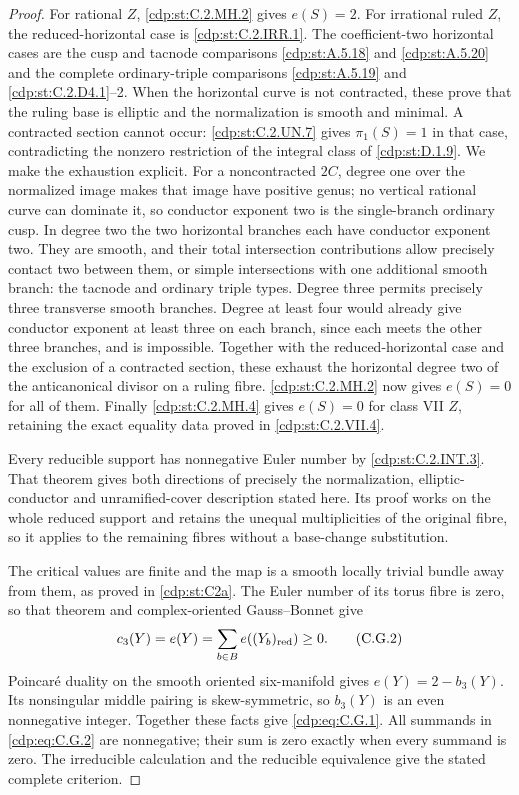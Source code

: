 \begin{proof}
For rational $Z$, \ref{cdp:st:C.2.MH.2} gives $e(S)=2$. For irrational
ruled $Z$, the reduced-horizontal case is \ref{cdp:st:C.2.IRR.1}. The
coefficient-two horizontal cases are the cusp and tacnode
comparisons \ref{cdp:st:A.5.18} and \ref{cdp:st:A.5.20} and the complete ordinary-triple
comparisons \ref{cdp:st:A.5.19} and \ref{cdp:st:C.2.D4.1}--2. When the horizontal curve
is not contracted, these prove that the ruling base is
elliptic and the normalization is smooth and minimal.
A contracted section cannot occur: \ref{cdp:st:C.2.UN.7} gives
$\pi_1(S)=1$ in that case, contradicting the nonzero
restriction of the integral class of \ref{cdp:st:D.1.9}.
We make the exhaustion explicit. For a noncontracted $2C$,
degree one over the normalized image makes that image have
positive genus; no vertical rational curve can dominate it,
so conductor exponent two is the single-branch ordinary
cusp. In degree two the two horizontal branches each have
conductor exponent two. They are smooth, and their total
intersection contributions allow precisely contact two
between them, or simple intersections with one additional
smooth branch: the tacnode and ordinary triple types.
Degree three permits precisely three transverse smooth
branches. Degree at least four would already give
conductor exponent at least three on each branch, since
each meets the other three branches, and is impossible.
Together with the reduced-horizontal case and the exclusion
of a contracted section,
these exhaust the horizontal degree two of the
anticanonical divisor on a ruling fibre. \ref{cdp:st:C.2.MH.2} now gives
$e(S)=0$ for all of them. Finally \ref{cdp:st:C.2.MH.4} gives $e(S)=0$ for
class VII $Z$, retaining the exact equality data proved in
\ref{cdp:st:C.2.VII.4}.

Every reducible support has nonnegative Euler number by
\ref{cdp:st:C.2.INT.3}. That theorem gives both directions of precisely
the normalization, elliptic-conductor and unramified-cover
description stated here. Its proof works on the whole
reduced support and retains the unequal multiplicities of
the original fibre, so it applies to the remaining fibres
without a base-change substitution.

The critical values are finite and the map is a smooth
locally trivial bundle away from them, as proved in \ref{cdp:st:C2a}.
The Euler number of its torus fibre is zero, so that theorem
and complex-oriented Gauss--Bonnet give
\[
                  c_3(Y)=e(Y)=\sum_{b\in B}e((Y_b)_{\rm red})\ge0.
                                                        \tag{C.G.2}\label{cdp:eq:C.G.2}
\]
Poincar\'e duality on the smooth oriented six-manifold gives
$e(Y)=2-b_3(Y)$. Its nonsingular middle pairing is
skew-symmetric, so $b_3(Y)$ is an even nonnegative integer.
Together these facts give \eqref{cdp:eq:C.G.1}. All summands in \eqref{cdp:eq:C.G.2}
are nonnegative; their sum is zero exactly when every
summand is zero. The irreducible calculation and the
reducible equivalence give the stated complete criterion.
\end{proof}


